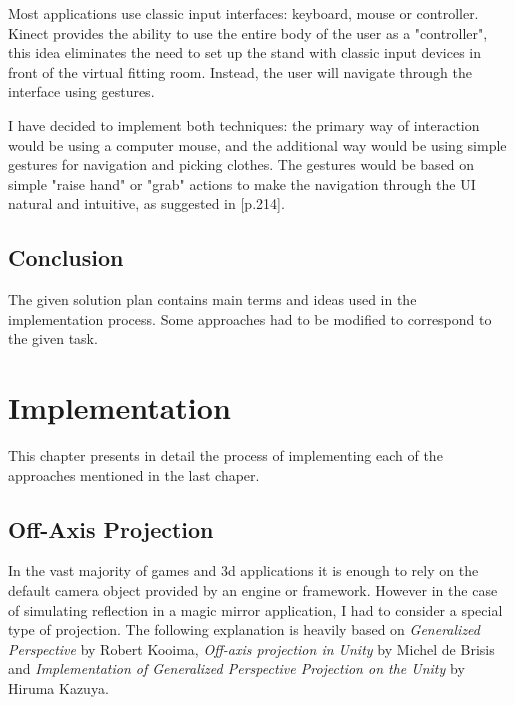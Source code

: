 \documentclass[a4paper]{report}
\begin{document}
  Most applications use classic input interfaces: keyboard, mouse or controller. Kinect provides the ability to use the entire body of the user as a "controller", this idea eliminates the need to set up the stand with classic input devices in front of the virtual fitting room. Instead, the user will navigate through the interface using gestures.
 
  I have decided to implement both techniques: the primary way of interaction would be using a computer mouse, and the additional way would be using simple gestures for navigation and picking clothes. The gestures would be based on simple "raise hand" or "grab" actions to make the navigation through the UI natural and intuitive, as suggested in \cite{practicalAR}[p.214]. 
  


\section{Conclusion}
\label{section_problemAnalysys_Conclusion}
 \qquad The given solution plan contains main terms and ideas used in the implementation process. Some approaches had to be modified to correspond to the given task.













\chapter{Implementation}
\label{chapter_Implementation}

\qquad This chapter presents in detail the process of implementing each of the approaches mentioned in the last chaper.

\section{Off-Axis Projection}
\label{offaxis}

\qquad In the vast majority of games and 3d applications it is enough to rely on the default camera object provided by an engine or framework. However in the case of simulating reflection in a magic mirror application, I had to consider a special type of projection. The following explanation is heavily based on \textit{Generalized Perspective} \cite{offaxisKooima} by Robert Kooima, \textit{Off-axis projection in Unity} \cite{offaxisUnityDeBrisis} by Michel de Brisis and \textit{Implementation of Generalized Perspective Projection on the Unity} \cite{offaxisUnityKazuya} by Hiruma Kazuya.
\end{document}
